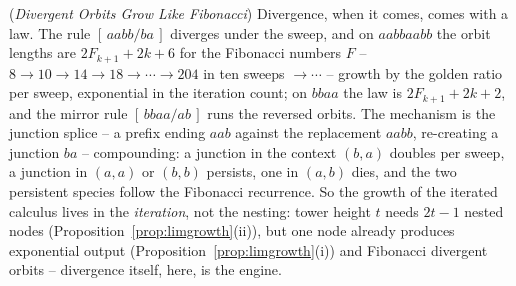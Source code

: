 \documentclass[runningheads,envcountsect]{llncs}
\renewenvironment{remark}
  {\rmfamily\trivlist\item[\hskip\labelsep{\itshape Remark.}]\ignorespaces}
  {\endtrivlist}
\begin{document}
\begin{remark}
    (\emph{Divergent Orbits Grow Like Fibonacci})
    \label{rem:fiborbit}
    Divergence, when it comes, comes with a law. The rule
    $[\,aabb/ba\,]$ diverges under the sweep, and on $aabbaabb$ the
    orbit lengths are
    $2F_{k+1} + 2k + 6$ for the Fibonacci numbers $F$ -- $8 \to 10
    \to 14 \to 18 \to \cdots \to 204$ in ten sweeps $\to \cdots$ --
    growth by the golden ratio per
    sweep, exponential in the iteration count; on $bbaa$ the law is
    $2F_{k+1} + 2k + 2$, and the mirror rule $[\,bbaa/ab\,]$ runs the
    reversed orbits. The
    mechanism is the junction splice -- a prefix ending $aab$ against
    the replacement $aabb$, re-creating a junction $ba$ -- compounding:
    a junction in the context $(b, a)$ doubles per sweep, a junction in
    $(a, a)$ or $(b, b)$ persists, one in $(a, b)$ dies, and the two
    persistent species follow the Fibonacci recurrence. So the growth
    of the iterated calculus lives in the \emph{iteration}, not the
    nesting: tower height $t$ needs $2t-1$ nested nodes
    (Proposition~\ref{prop:limgrowth}(ii)), but one node already
    produces exponential output (Proposition~\ref{prop:limgrowth}(i))
    and Fibonacci divergent orbits -- divergence itself, here, is the
    engine.
\end{remark}
\end{document}
